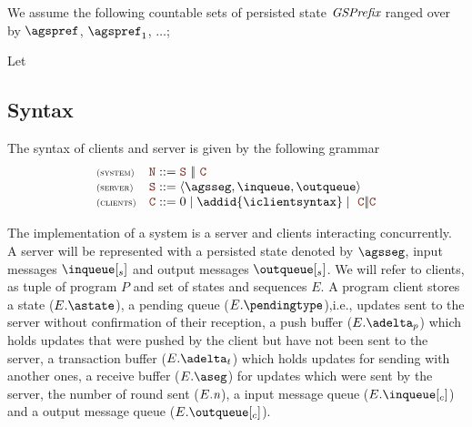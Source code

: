 \documentclass[envcountsect,runningheads,orivec]{llncs}
\begin{document}



 

We assume the following countable sets of persisted state $\textit{GSPrefix}$ ranged over by $\agspref$, $\agspref_1$, $\ldots$; 

Let \\



\subsection{Syntax}
 \begin{definition} 
	The syntax of clients and server is given by the following grammar 
  \[
    \begin{array}{l@{\quad}r@{\;::=\;}l}
	\rName{system} & \isystemterm &  \iserver\ \bigpar\ \iclient \\
	\rName{server} & \iserver & \server{\persistedstate}{\inqueue}{\outqueue} \\
	\rName{clients}& \iclient & \zero \;|\; 
							\addid{\iclientsyntax}
							\;|\; \ 
							\iclient \bigpar \iclient  \\
     \end{array}
  \]
 \end{definition}
 
The implementation of a system is a server and clients interacting concurrently. A server will be represented with a persisted state denoted by $\persistedstate$, input messages $\inserver$ and output messages $\outserver$.
We will refer to clients, as tuple of program $P$ and set of states and sequences $E$. A program client stores a state ($E.\known$), a pending queue ($E.\pending$),i.e., updates sent to the server without confirmation of their reception, a push buffer ($E.\pushbuffer$) which holds updates that were pushed by the client but have not been sent to the server, a transaction buffer ($E.\transactionbuffer$) which holds updates for sending with another ones, a receive buffer ($E.\receivebuffertype$) for updates which were sent by the server, the number of round sent ($E.\textit{n}$), a input message queue ($E.\inclient$) and a output message queue ($E.\outclient$).
\end{document}

